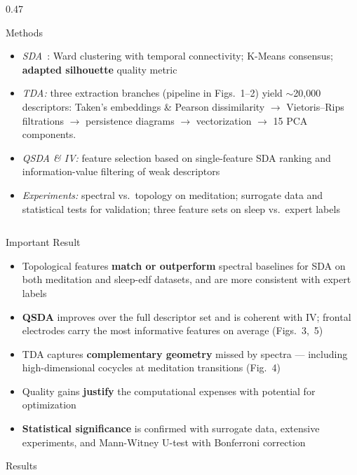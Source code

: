 \documentclass[final]{beamer}
\newlength{\twocolwid}
\begin{document}
\begin{frame}[t]
\begin{columns}[t]
\begin{column}{\twocolwid}
\begin{columns}[T,totalwidth=\dimexpr\twocolwid-0.4cm\relax]
\begin{column}{0.47\textwidth}
\begin{block}{Methods}
\begin{itemize}
\item \textit{SDA}~\cite{SDA}: Ward clustering with temporal connectivity; K-Means consensus; \textbf{adapted silhouette} quality metric
\item \textit{TDA:} three extraction branches (pipeline in Figs.~1--2) yield $\sim$20,000 descriptors: Taken's embeddings \& Pearson dissimilarity $\rightarrow$ Vietoris--Rips filtrations $\rightarrow$ persistence diagrams $\rightarrow$ vectorization $\rightarrow$ 15 PCA components.
\item \textit{QSDA \& IV:} feature selection based on single-feature SDA ranking and information-value filtering of weak descriptors
\item \textit{Experiments:} spectral vs.\ topology on meditation; surrogate data and statistical tests for validation; three feature sets on sleep vs.\ expert labels
\end{itemize}

\end{block}

\end{column}

\end{columns}

\begin{alertblock}{Important Result}

\begin{itemize}
\item Topological features \textbf{match or outperform} spectral baselines for SDA on both meditation and sleep-edf datasets, and are more consistent with expert labels
\item \textbf{QSDA} improves over the full descriptor set and is coherent with IV; frontal electrodes carry the most informative features on average (Figs.~3,~5)
\item TDA captures \textbf{complementary geometry} missed by spectra --- including high-dimensional cocycles at meditation transitions (Fig.~4)
\item Quality gains \textbf{justify} the computational expenses with potential for optimization
\item \textbf{Statistical significance} is confirmed with surrogate data, extensive experiments, and Mann-Witney U-test with Bonferroni correction
\end{itemize}

\end{alertblock}

\begin{block}{Results}


\end{block}
\end{column}
\end{columns}
\end{frame}
\end{document}
